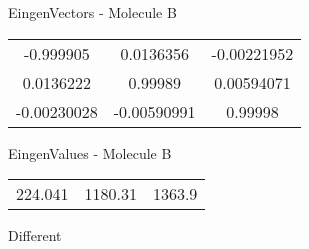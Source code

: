\begin{multicols}{2}
\begin{center}
\vtab
 EingenVectors - Molecule B     \\
\vtab
\begin{tabular}{|c c c|}
-0.999905	 & 	0.0136356	 & 	-0.00221952	 \\
0.0136222	 & 	0.99989	 & 	0.00594071	 \\
-0.00230028	 & 	-0.00590991	 & 	0.99998
\end{tabular}

\vtab
 EingenValues - Molecule B     \\
\vtab
\begin{tabular}{|c c c|}
224.041	 & 	1180.31	 & 	1363.9	 \\
\end{tabular}

\end{center}
\end{multicols}
\begin{center}
\vtab
\vtab
\textcolor{NavyBlue}{\Large Different}
\end{center}

 \newpage

